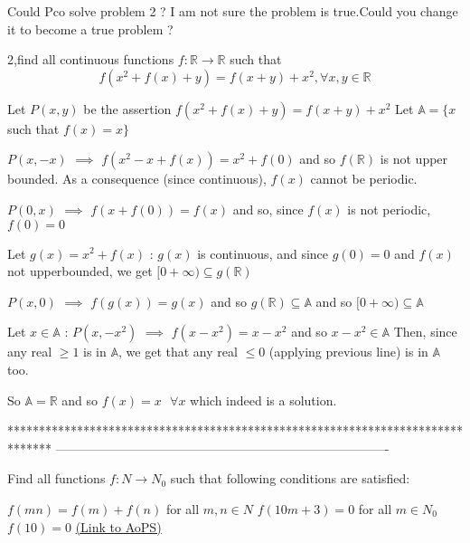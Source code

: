 \begin{solution}
	Could Pco solve problem 2 ? I am not sure the problem is true.Could you change it  to become a true problem ?
\end{solution}



\begin{solution}
	\begin{tcolorbox}2,find all continuous  functions $f:\mathbb{R}\to\mathbb{R}$ such that \[f(x^2+ f(x)+y)=f(x+y)+x^2,\forall x,y\in\mathbb{R}\]\end{tcolorbox}
Let $P(x,y)$ be the assertion $f(x^2+f(x)+y)=f(x+y)+x^2$
Let $\mathbb A=\{x$ such that $f(x)=x\}$

$P(x,-x)$ $\implies$ $f(x^2-x+f(x))=x^2+f(0)$ and so $f(\mathbb R)$ is not upper bounded. 
As a consequence (since continuous), $f(x)$ cannot be periodic.

$P(0,x)$ $\implies$ $f(x+f(0))=f(x)$ and so, since $f(x)$ is not periodic, $f(0)=0$

Let $g(x)=x^2+f(x)$ : $g(x)$ is continuous, and since $g(0)=0$ and $f(x)$ not upperbounded, we get $[0+\infty)\subseteq g(\mathbb R)$

$P(x,0)$ $\implies$ $f(g(x))=g(x)$ and so $g(\mathbb R)\subseteq \mathbb A$ and so $[0+\infty)\subseteq \mathbb A$

Let $x\in \mathbb A$ : $P(x,-x^2)$ $\implies$ $f(x-x^2)=x-x^2$ and so $x-x^2\in\mathbb A$
Then, since any real $\ge 1$ is in $\mathbb A$, we get that any real $\le 0$ (applying previous line) is in $\mathbb A$ too.

So $\mathbb A=\mathbb R$ and so $\boxed{f(x)=x\text{   }\forall x}$ which indeed is a solution.
\end{solution}
*******************************************************************************
-------------------------------------------------------------------------------

\begin{problem}
	Find all functions $f:N \to N_0$ such that following conditions are satisfied:

$f(mn)=f(m)+f(n)$ for all  $m,n\in N$
$f(10m+3)=0$ for all $m\in N_0$
$f(10)=0$
	\flushright \href{https://artofproblemsolving.com/community/c6h527022}{(Link to AoPS)}
\end{problem}



